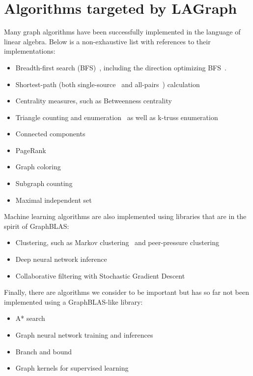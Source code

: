 \section{Algorithms targeted by LAGraph}
\label{sec:algorithms}

Many graph algorithms have been successfully implemented in the language of linear algebra. Below is a non-exhaustive list with references to their implementations:

\begin{itemize}
\item Breadth-first search (BFS)~\cite{bulucc2011parallel, gbtl-cuda16, Davis19}, including the direction optimizing BFS~\cite{Yang:2018:IPE}.
\item Shortest-path (both single-source~\cite{Yang:2019:GBL, ssspgrapl19} and all-pairs~\cite{ca_apsp}) calculation
\item Centrality measures, such as Betweenness centrality~\cite{combblas}
\item Triangle counting and enumeration~\cite{trianglegabb15, wang2016comparative} as well as k-truss enumeration~\cite{}
\item Connected components~\cite{lacc2019}
\item PageRank~\cite{satish2014navigating}
\item Graph coloring~\cite{coloringgrapl19}
\item Subgraph counting~\cite{chen2019graphblas}
\item Maximal independent set~\cite{jpdc15, Yang:2019:GBL}
\end{itemize}

Machine learning algorithms are also implemented using libraries that are in the spirit of GraphBLAS:
\begin{itemize}
\item Clustering, such as Markov clustering~\cite{azad2018hipmcl} and peer-pressure clustering~\cite{}
\item Deep neural network inference~\cite{kepner2017enabling}
\item Collaborative filtering with Stochastic Gradient Descent~\cite{satish2014navigating}
\end{itemize}

Finally, there are algorithms we consider to be important but has so far not been implemented using a GraphBLAS-like library:
\begin{itemize}
\item A* search
\item Graph neural network training and inferences
\item Branch and bound
\item Graph kernels for supervised learning
\end{itemize}
